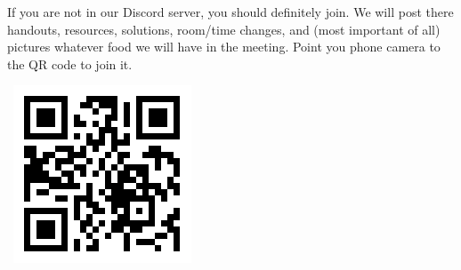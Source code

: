 \documentclass{scrartcl}
\theoremstyle{definition}
\begin{document}
	\begin{minipage}{.85\textwidth}{}
		\footnotesize
		If you are not in our Discord server, you should definitely join.
		We will post there handouts, resources, solutions, room/time changes, and (most important of all) pictures whatever food we will have in the meeting. Point you phone camera to the QR code to join it.
	\end{minipage}
	\begin{minipage}{.15\textwidth}{}
		\ \hfill \includegraphics[height = .8in]{qr}
	\end{minipage}
\end{document}
